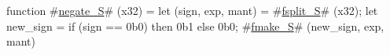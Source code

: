 function #\hyperref[sailRISCVznegatezyS]{negate\_S}# (x32) = {
  let (sign, exp, mant) = #\hyperref[sailRISCVzfsplitzyS]{fsplit\_S}# (x32);
  let new_sign = if (sign == 0b0) then 0b1 else 0b0;
  #\hyperref[sailRISCVzfmakezyS]{fmake\_S}# (new_sign, exp, mant)
}
